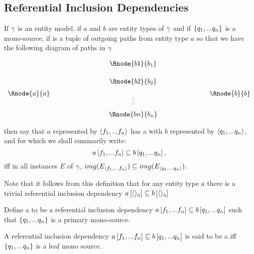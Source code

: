 \subsection{Referential Inclusion Dependencies}
\label{referentialinclusiondependency}

\begin{definition}
If $\gamma$ is an entity model, 
if $a$ and $b$ are entity types of  $\gamma$ and  if $\left\{q_1,...q_n\right\}$
is a mono-source,
if \fntuple is a tuple of outgoing paths from entity type $a$  
so that we have the following diagram of paths in $\gamma$
\setlength{\arraycolsep}{.2cm}
\begin{center}
$
\begin{array}{cp{2cm}ccp{2cm}c}
             & &         & \Rnode{b1}{b_1} &&               \\ [0.5cm]
						 & &         & \Rnode{b2}{b_2} &&               \\ [0.2cm]
\Rnode{a}{a} & &         &                 &&  \Rnode{b}{b} \\ [-0.2cm]						
             & &         &    \vdots       &&               \\ [0.2cm]
             & &         & \Rnode{bn}{b_n} &&               \\ 
\end{array}
$
\end{center}
then say that $a$ represented by $\langle f_1,...f_n\rangle$ 
has a  with $b$ represented by $\langle q_1,...q_n\rangle$, and for which we shall summarily write:
$$
a\left[f_1,...f_n\right]\subseteq b\left[q_1,...q_n\right],
$$
iff in all instances $E$ of $\gamma$,
$img(E_{\langle f_1,...f_n\rangle}) \subseteq img(E_{\langle q_1,...q_n\rangle})$. 
\end{definition}

Note that it follows from this definition that for any entity type $a$ there is a trivial
referential inclusion dependency $
a\left[\langle\rangle_a\right]\subseteq b\left[\langle\rangle_a\right]$

\begin{definition}
Define a  to be a
referential inclusion dependency $a\left[f_1,...f_n\right]\subseteq b\left[q_1,...q_n\right]$
such that $\left\{q_1,...q_n\right\}$ is a primary mono-source.
\end{definition}

\begin{definition} 
A referential inclusion dependency $a\left[f_1,...f_n\right]\subseteq b\left[q_1,...q_n\right]$ is said to be a  iff $\left\{q_1,...q_n\right\}$ is a leaf mono source.
\end{definition}

